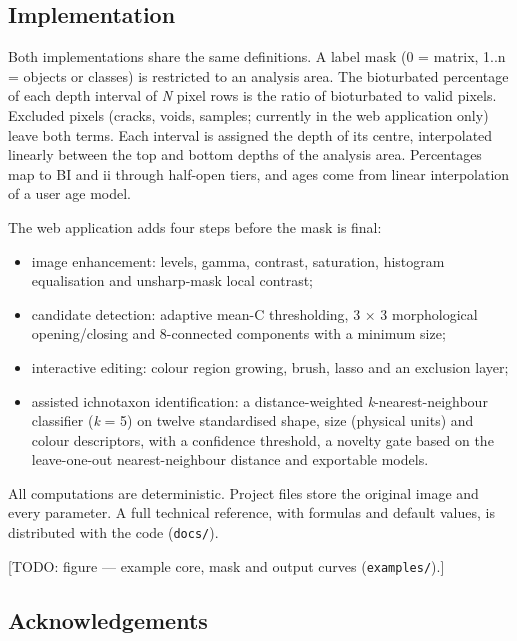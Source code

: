 \documentclass[
  10pt,
]{article}
\providecommand{\tightlist}{%
  \setlength{\itemsep}{0pt}\setlength{\parskip}{0pt}}
\begin{document}
\hypertarget{implementation}{%
\subsection{Implementation}\label{implementation}}

Both implementations share the same definitions. A label mask (0 =
matrix, 1..n = objects or classes) is restricted to an analysis area.
The bioturbated percentage of each depth interval of \emph{N} pixel rows
is the ratio of bioturbated to valid pixels. Excluded pixels (cracks,
voids, samples; currently in the web application only) leave both terms.
Each interval is assigned the depth of its centre, interpolated linearly
between the top and bottom depths of the analysis area. Percentages map
to BI and ii through half-open tiers, and ages come from linear
interpolation of a user age model.

The web application adds four steps before the mask is final:

\begin{itemize}
\tightlist
\item
  image enhancement: levels, gamma, contrast, saturation, histogram
  equalisation and unsharp-mask local contrast;
\item
  candidate detection: adaptive mean-C thresholding, 3 × 3 morphological
  opening/closing and 8-connected components with a minimum size;
\item
  interactive editing: colour region growing, brush, lasso and an
  exclusion layer;
\item
  assisted ichnotaxon identification: a distance-weighted
  \emph{k}-nearest-neighbour classifier (\emph{k} = 5) on twelve
  standardised shape, size (physical units) and colour descriptors, with
  a confidence threshold, a novelty gate based on the leave-one-out
  nearest-neighbour distance and exportable models.
\end{itemize}

All computations are deterministic. Project files store the original
image and every parameter. A full technical reference, with formulas and
default values, is distributed with the code (\texttt{docs/}).

{[}TODO: figure --- example core, mask and output curves
(\texttt{examples/}).{]}

\hypertarget{acknowledgements}{%
\subsection{Acknowledgements}\label{acknowledgements}}
\end{document}
